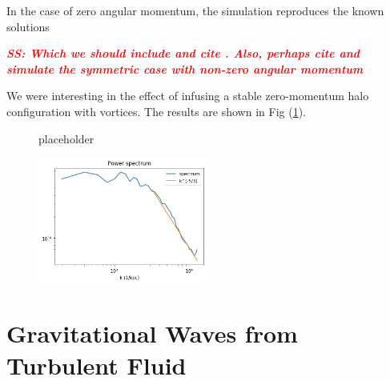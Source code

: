 \documentclass[onecolumn,nofootinbib,superscriptaddress]{revtex4}
\newcommand{\stst}[1]{\textcolor{red}{\it{\textbf{SS: #1}}} }
\begin{document}
In the case of zero angular momentum, the simulation reproduces the known solutions 
{\stst{Which we should include and cite \cite{Schiappacasse:2017ham}. Also, perhaps cite \cite{Hertzberg:2018lmt} and simulate the symmetric case with non-zero angular momentum}

We were interesting in the effect of infusing a stable zero-momentum halo configuration with vortices. The results are shown in Fig (\ref{fig:sub2}). 

\begin{figure}[ht]  
\label{fig:1}
\centering
{}    
\caption{placeholder} 
\label{fig:sub2}
\end{figure}

\begin{figure}
\includegraphics[width=0.5\textwidth, keepaspectratio]{../PaperPlots/spectrum.png}
\end{figure}

\section{Gravitational Waves from Turbulent Fluid}

}
\end{document}
